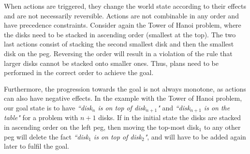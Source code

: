 


When actions are triggered, they change the world state according to their effects and are not necessarily reversible. 
Actions are not combinable in any order and have precedence constraints. 
Consider again the Tower of Hanoi problem, where the disks need to be stacked in ascending order (smallest at the top). 
The two last actions consist of stacking the second smallest disk and then the smallest disk on the peg. 
Reversing the order will result in a violation of the rule that larger disks cannot be stacked onto smaller ones. Thus, plans need to be performed in the correct order to achieve the goal.

Furthermore, the progression towards the goal is not always monotone, as actions can also have negative effects. 
In the example with the Tower of Hanoi problem, our goal state is to have \textit{``disk$_{n}$ is on top of disk$_{n+1}$"} and \textit{``disk$_{n+1}$ is on the table"} for a problem with $n+1$ disks. 
If in the initial state the disks are stacked in ascending order on the left peg, then moving the top-most disk$_1$ to any other peg will delete the fact \textit{``disk$_1$ is on top of disk$_2$"}, and will have to be added again later to fulfil the goal. %




